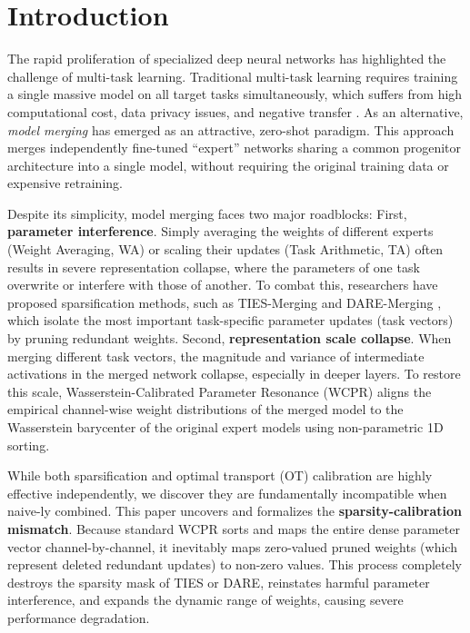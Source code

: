\documentclass{article}
\theoremstyle{plain}
\theoremstyle{definition}
\theoremstyle{remark}
\begin{document}
\section{Introduction}
\label{sec:intro}

The rapid proliferation of specialized deep neural networks has highlighted the challenge of multi-task learning. Traditional multi-task learning requires training a single massive model on all target tasks simultaneously, which suffers from high computational cost, data privacy issues, and negative transfer \cite{zhang2017overview, yu2020gradient}. As an alternative, \emph{model merging} \cite{izmailov2018averaging, ilharco2022editing, wortsman2022model, mcmahan2017communication} has emerged as an attractive, zero-shot paradigm. This approach merges independently fine-tuned ``expert'' networks sharing a common progenitor architecture into a single model, without requiring the original training data or expensive retraining.

Despite its simplicity, model merging faces two major roadblocks:
First, \textbf{parameter interference}. Simply averaging the weights of different experts (Weight Averaging, WA) or scaling their updates (Task Arithmetic, TA) often results in severe representation collapse, where the parameters of one task overwrite or interfere with those of another. To combat this, researchers have proposed sparsification methods, such as TIES-Merging \cite{yadav2023ties} and DARE-Merging \cite{yu2023language}, which isolate the most important task-specific parameter updates (task vectors) by pruning redundant weights.
Second, \textbf{representation scale collapse}. When merging different task vectors, the magnitude and variance of intermediate activations in the merged network collapse, especially in deeper layers. To restore this scale, Wasserstein-Calibrated Parameter Resonance (WCPR) \cite{submission9} aligns the empirical channel-wise weight distributions of the merged model to the Wasserstein barycenter of the original expert models using non-parametric 1D sorting.

While both sparsification and optimal transport (OT) calibration are highly effective independently, we discover they are fundamentally incompatible when naive-ly combined. This paper uncovers and formalizes the \textbf{sparsity-calibration mismatch}. Because standard WCPR sorts and maps the entire dense parameter vector channel-by-channel, it inevitably maps zero-valued pruned weights (which represent deleted redundant updates) to non-zero values. This process completely destroys the sparsity mask of TIES or DARE, reinstates harmful parameter interference, and expands the dynamic range of weights, causing severe performance degradation.
\end{document}
